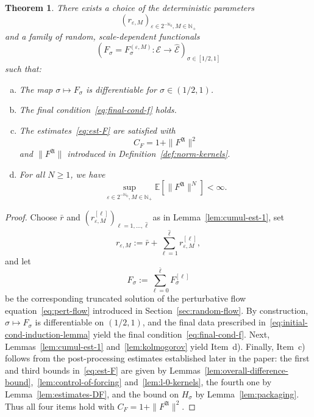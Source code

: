 \documentclass{article}
\numberwithin{equation}{section}
\newcommand{\assign}{:=}
\theoremstyle{plain}
\newtheorem{theorem}{Theorem}[section]
\theoremstyle{definition}
\begin{document}
\begin{theorem}
  \label{thm:effective-force}There exists a choice of the deterministic
  parameters
  \[ (r_{\varepsilon, M})_{\varepsilon \in 2^{-\mathbb N_0}, M \in \mathbb{N}_+} \]
  and a family of random, scale-dependent functionals
  \[ \left( F_{\sigma} {= F_{\sigma}^{(\varepsilon, M)}}  : \mathcal{E}
     \rightarrow \hat{\mathcal{E}} \right)_{\sigma \in [1 / 2, 1]} \]
  such that:
  \begin{enumerate}[(a)]
    \item The map $\sigma \mapsto F_{\sigma}$ is differentiable for $\sigma
    \in (1 / 2, 1)$.
    
    \item The final condition~\eqref{eq:final-cond-f} holds.
    
    \item The estimates~\eqref{eq:est-F} are satisfied with \[C_F = 1 + \|
    F^{\mathfrak{A}} \|^2\] and $\| F^{\mathfrak{A}} \|$ introduced in
    Definition~\ref{def:norm-kernels}.
    
    \item For all $N \geqslant 1$, we have
    \begin{equation}
      \sup_{\varepsilon \in 2^{-\mathbb{N}_0}, M \in \mathbb{N}_+} \mathbb{E}
      [\| F^{\mathfrak{A}} \|^N] < \infty .
      \label{eq:stochastic-estimates-kernels}
    \end{equation}
  \end{enumerate}
\end{theorem}

\begin{proof}
  Choose $\bar{r}$ and $(r^{[\ell]}_{\varepsilon, M})_{\ell = 1, \ldots,
  \hat{\ell}}$ as in Lemma~\ref{lem:cumul-est-1}, set
  \[ r_{\varepsilon, M} \assign \bar{r} + \sum_{\ell = 1}^{\hat{\ell}}
     r^{[\ell]}_{\varepsilon, M}, \]
  and let
  \[ F_{\sigma} \assign \sum_{\ell = 0}^{\bar{\ell}} F_{\sigma}^{[\ell]} \]
  be the corresponding truncated solution of the perturbative flow
  equation~\eqref{eq:pert-flow} introduced in
  Section~\ref{sec:random-flow}. By construction, $\sigma \mapsto F_{\sigma}$
  is differentiable on $(1 / 2, 1)$, and the final data prescribed
  in~\eqref{eq:initial-cond-induction-lemma} yield the final
  condition~\eqref{eq:final-cond-f}. Next, Lemmas~\ref{lem:cumul-est-1}
  and~\ref{lem:kolmogorov} yield Item~d). Finally, Item~c) follows from the post-processing
  estimates established later in the paper: the first and third bounds
  in~\eqref{eq:est-F} are given by
  Lemmas~\ref{lem:overall-difference-bound},~\ref{lem:control-of-forcing}
  and~\ref{lem:l-0-kernels}, the fourth one by
  Lemma~\ref{lem:estimates-DF}, and the bound on $H_{\sigma}$ by
  Lemma~\ref{lem:packaging}. Thus all four items hold with
  $C_F = 1 + \| F^{\mathfrak{A}} \|^2$.
\end{proof}
\end{document}

